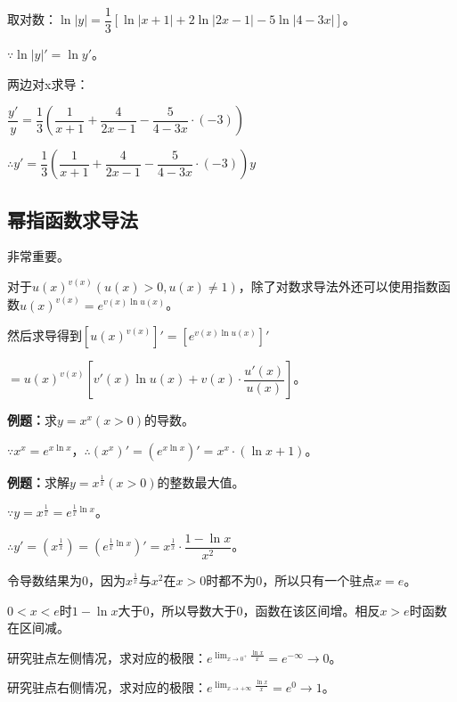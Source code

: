 \documentclass[UTF8, 12pt]{ctexart}
\begin{document}
取对数：$\ln\vert y\vert=\dfrac{1}{3}[\ln\vert x+1\vert+2\ln\vert 2x-1\vert-5\ln\vert 4-3x\vert]$。

$\because \ln\vert y\vert'=\ln y'$。

两边对x求导：

$\dfrac{y'}{y}=\dfrac{1}{3}\left(\dfrac{1}{x+1}+\dfrac{4}{2x-1}-\dfrac{5}{4-3x}\cdot(-3)\right)$

$\therefore y'=\dfrac{1}{3}\left(\dfrac{1}{x+1}+\dfrac{4}{2x-1}-\dfrac{5}{4-3x}\cdot(-3)\right)y$

\subsection{幂指函数求导法}

非常重要。

对于$u(x)^{v(x)}(u(x)>0,u(x)\neq 1)$，除了对数求导法外还可以使用指数函数$u(x)^{v(x)}=e^{v(x)\ln u(x)}$。

然后求导得到$[u(x)^{v(x)}]'$$=[e^{v(x)\ln u(x)}]'$

$=u(x)^{v(x)}\left[v'(x)\ln u(x)+v(x)\cdot\dfrac{u'(x)}{u(x)}\right]$。

\textbf{例题：}求$y=x^x(x>0)$的导数。

$\because x^x=e^{x\ln x}$，$\therefore (x^x)'=(e^{x\ln x})'=x^x\cdot(\ln x+1)$。

\textbf{例题：}求解$y=x^{\frac{1}{x}}(x>0)$的整数最大值。

$\because y=x^{\frac{1}{x}}=e^{\frac{1}{x}\ln x}$。

$\therefore y'=\left(x^{\frac{1}{x}}\right)=\left(e^{\frac{1}{x}\ln x}\right)'=x^{\frac{1}{x}}\cdot\dfrac{1-\ln x}{x^2}$。

令导数结果为0，因为$x^{\frac{1}{x}}$与$x^2$在$x>0$时都不为0，所以只有一个驻点$x=e$。

$0<x<e$时$1-\ln x$大于0，所以导数大于0，函数在该区间增。相反$x>e$时函数在区间减。

研究驻点左侧情况，求对应的极限：$e^{\lim_{x\to 0^+}\frac{\ln x}{x}}=e^{-\infty}\to 0$。

研究驻点右侧情况，求对应的极限：$e^{\lim_{x\to+\infty}\frac{\ln x}{x}}=e^0\to 1$。

\end{document}
